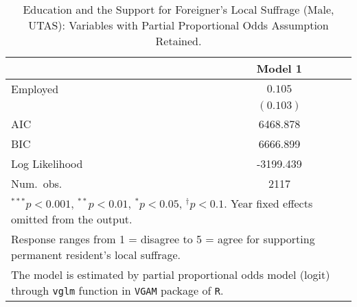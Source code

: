 
\begin{table}
\caption{Education and the Support for Foreigner's Local Suffrage (Male, UTAS): Variables with Partial Proportional Odds Assumption Retained.}
\begin{center}
\begin{tabular}{l c }
\toprule
 & Model 1 \\
\midrule
Employed       & $0.105$   \\
               & $(0.103)$ \\
\midrule
AIC            & 6468.878  \\
BIC            & 6666.899  \\
Log Likelihood & -3199.439 \\
Num.\ obs.     & 2117      \\
\bottomrule
\multicolumn{2}{l}{\scriptsize{$^{***}p<0.001$, $^{**}p<0.01$, $^*p<0.05$, $^{\dagger}p<0.1$. Year fixed effects omitted from the output.}} \\ \multicolumn{2}{l}{\scriptsize{Response ranges from 1 = disagree to 5 = agree for supporting permanent resident's local suffrage.}} \\ \multicolumn{2}{l}{\scriptsize{The model is estimated by partial proportional odds model (logit) through \texttt{vglm} function in \texttt{VGAM} package of \texttt{R}.}}
\end{tabular}
\label{goltab_umom_pr}
\end{center}
\end{table}

